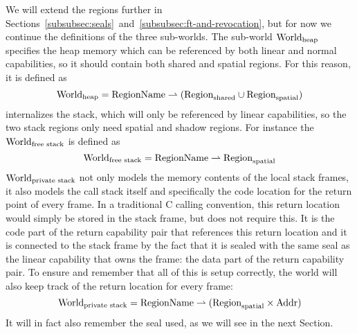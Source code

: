 \begin{jversion}
We will extend the regions further in Sections~\ref{subsubsec:seals}~and~\ref{subsubsec:ft-and-revocation}, but for now we continue the definitions of the three sub-worlds.
The sub-world $\mathrm{World}_\mathrm{heap}$ specifies the heap memory which can be referenced by both linear and normal capabilities, so it should contain both shared and spatial regions.
For this reason, it is defined as
\[
  \mathrm{World}_\mathrm{heap} = \mathrm{RegionName} \rightharpoonup (\mathrm{Region}_\mathrm{shared} \cup \mathrm{Region}_\mathrm{spatial})
\]
\srccm{} internalizes the \stktokens{} stack, which will only be referenced by linear capabilities, so the two stack regions only need spatial and shadow regions.
For instance the $\mathrm{World}_\text{free stack}$ is defined as
\[
  \mathrm{World}_\text{free stack} = \mathrm{RegionName} \rightharpoonup \mathrm{Region}_\mathrm{spatial}
\]
$\mathrm{World}_\text{private stack}$ not only models the memory contents of the local stack frames, it also models the call stack itself and specifically the code location for the return point of every frame.
In a traditional C calling convention, this return location would simply be stored in the stack frame, but \stktokens{} does not require this.
It is the code part of the return capability pair that references this return location and it is connected to the stack frame by the fact that it is sealed with the same seal as the linear capability that owns the frame: the data part of the return capability pair.
To ensure and remember that all of this is setup correctly, the world will also keep track of the return location for every frame:
\[
\mathrm{World}_\text{private stack} = \mathrm{RegionName} \rightharpoonup (\mathrm{Region}_\mathrm{spatial} \times \mathrm{Addr})
\]
It will in fact also remember the seal used, as we will see in the next Section.


\end{jversion}
